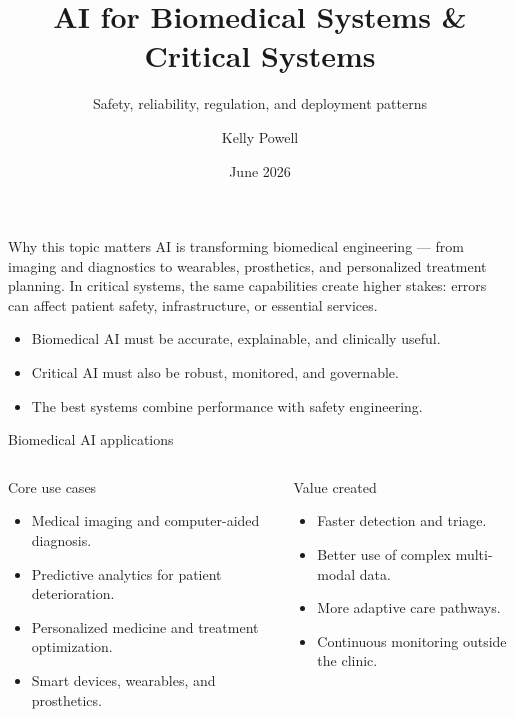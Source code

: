 \documentclass[aspectratio=169]{beamer}
\title[AI for Biomedical \& Critical Systems]{AI for Biomedical Systems \& Critical Systems}
\subtitle{Safety, reliability, regulation, and deployment patterns}
\author{Kelly Powell}
\institute{UAB Heersink School of Medicine}
\date{June 2026}
\begin{document}
\begin{frame}[plain]
\titlepage
\end{frame}

\begin{frame}{Why this topic matters}
AI is transforming biomedical engineering --- from imaging and diagnostics to wearables, prosthetics, and personalized treatment planning. In critical systems, the same capabilities create higher stakes: errors can affect patient safety, infrastructure, or essential services.
\begin{itemize}
  \item Biomedical AI must be accurate, explainable, and clinically useful.
  \item Critical AI must also be robust, monitored, and governable.
  \item The best systems combine performance with safety engineering.
\end{itemize}
\end{frame}

\begin{frame}{Biomedical AI applications}
\begin{columns}[T,onlytextwidth]
  \begin{block}{Core use cases}
    \begin{itemize}
      \item Medical imaging and computer-aided diagnosis.
      \item Predictive analytics for patient deterioration.
      \item Personalized medicine and treatment optimization.
      \item Smart devices, wearables, and prosthetics.
    \end{itemize}
  \end{block}
  \begin{block}{Value created}
    \begin{itemize}
      \item Faster detection and triage.
      \item Better use of complex multi-modal data.
      \item More adaptive care pathways.
      \item Continuous monitoring outside the clinic.
    \end{itemize}
  \end{block}
\end{columns}
\end{frame}
\end{document}
